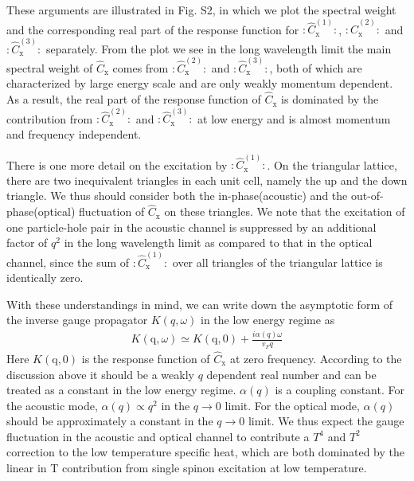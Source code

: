 \documentclass[12pt]{article}
\begin{document}
These arguments are illustrated in Fig. S2, in which we plot the spectral weight and the corresponding real part of the response function for $:\hat{C}^{(1)}_{\mathrm{x}}:$, $:\hat{C}^{(2)}_{\mathrm{x}}:$ and $:\hat{C}^{(3)}_{\mathrm{x}}:$ separately. From the plot we see in the long wavelength limit the main spectral weight of $\hat{C}_{\mathrm{x}}$ comes from $:\hat{C}^{(2)}_{\mathrm{x}}:$ and $:\hat{C}^{(3)}_{\mathrm{x}}:$, both of which are characterized by large energy scale and are only weakly momentum dependent. As a result, the real part of the response function of $\hat{C}_{\mathrm{x}}$ is dominated by the contribution from $:\hat{C}^{(2)}_{\mathrm{x}}:$ and $:\hat{C}^{(3)}_{\mathrm{x}}:$ at low energy and is almost momentum and frequency independent.

There is one more detail on the excitation by $:\hat{C}^{(1)}_{\mathrm{x}}:$. On the triangular lattice, there are two inequivalent triangles in each unit cell, namely the up and the down triangle. We thus should consider both the in-phase(acoustic) and the out-of-phase(optical) fluctuation of $\hat{C}_{\mathrm{x}}$ on these triangles. We note that the excitation of one particle-hole pair in the acoustic channel is suppressed by an additional factor of $q^{2}$ in the long wavelength limit as compared to that in the optical channel, since the sum of $:\hat{C}^{(1)}_{\mathrm{x}}:$ over all triangles of the triangular lattice is identically zero.   

With these understandings in mind, we can write down the asymptotic form of the inverse gauge propagator $K(q,\omega)$ in the low energy regime as 
\begin{eqnarray}
K(\mathrm{q},\omega)\simeq K(\mathrm{q},0)+\frac{i\alpha(q)\omega}{v_{F}q}\nonumber
\end{eqnarray}
Here $K(\mathrm{q},0)$ is the response function of $\hat{C}_{\mathrm{x}}$ at zero frequency. According to the discussion above it should be a weakly $q$ dependent real number and can be treated as a constant in the low energy regime.  $\alpha(q)$ is a coupling constant. For the acoustic mode, $\alpha(q)\propto q^{2}$ in the $q\to 0$ limit. For the optical mode, $\alpha(q)$ should be approximately a constant in the $q\to 0$ limit. We thus expect the gauge fluctuation in the acoustic and optical channel to contribute a $T^{4}$ and $T^{2}$ correction to the low temperature specific heat, which are both dominated by the linear in T contribution from single spinon excitation at low temperature.
  
\end{document}
